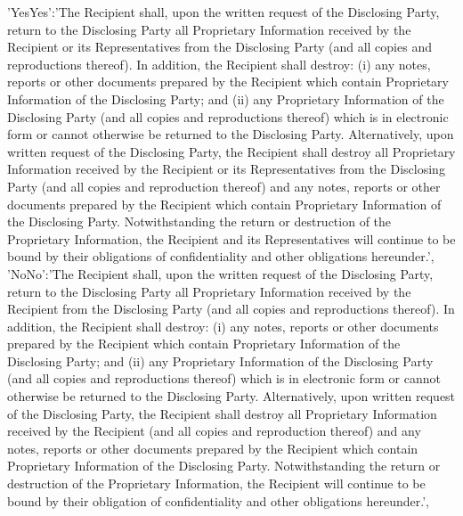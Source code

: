 \documentclass[12pt]{article}
\newcommand{\VAR}[1]{{\color{blue}#1}}
\begin{document}
\VAR{
    {
        'YesYes':'The Recipient shall, upon the written request of the Disclosing Party, return to the Disclosing Party all Proprietary Information received by the Recipient or its Representatives from the Disclosing Party (and all copies and reproductions thereof). In addition, the Recipient shall destroy:  (i) any notes, reports or other documents prepared by the Recipient which contain Proprietary Information of the Disclosing Party; and (ii) any Proprietary Information of the Disclosing Party (and all copies and reproductions thereof) which is in electronic form or cannot otherwise be returned to the Disclosing Party. Alternatively, upon written request of the Disclosing Party, the Recipient shall destroy all Proprietary Information received by the Recipient or its Representatives from the Disclosing Party (and all copies and reproduction thereof) and any notes, reports or other documents prepared by the Recipient which contain Proprietary Information of the Disclosing Party. Notwithstanding the return or destruction of the Proprietary Information, the Recipient and its Representatives will continue to be bound by their obligations of confidentiality and other obligations hereunder.',
        'NoNo':'The Recipient shall, upon the written request of the Disclosing Party, return to the Disclosing Party all Proprietary Information received by the Recipient from the Disclosing Party (and all copies and reproductions thereof). In addition, the Recipient shall destroy:  (i) any notes, reports or other documents prepared by the Recipient which contain Proprietary Information of the Disclosing Party; and (ii) any Proprietary Information of the Disclosing Party (and all copies and reproductions thereof) which is in electronic form or cannot otherwise be returned to the Disclosing Party. Alternatively, upon written request of the Disclosing Party, the Recipient shall destroy all Proprietary Information received by the Recipient (and all copies and reproduction thereof) and any notes, reports or other documents prepared by the Recipient which contain Proprietary Information of the Disclosing Party. Notwithstanding the return or destruction of the Proprietary Information, the Recipient will continue to be bound by their obligation of confidentiality and other obligations hereunder.',
}}
\end{document}
